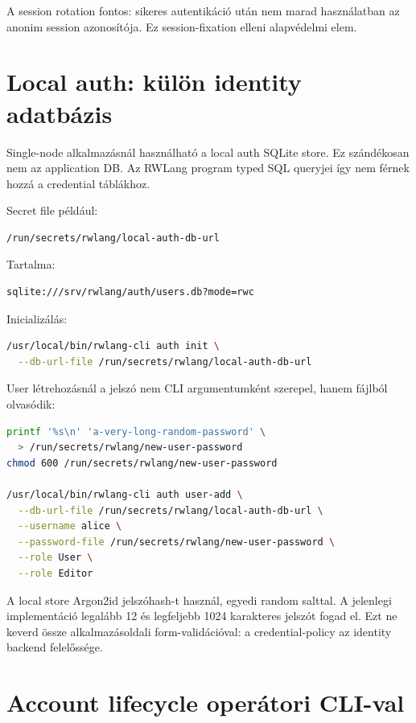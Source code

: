 A session rotation fontos: sikeres autentikáció után nem marad használatban az anonim session azonosítója. Ez session-fixation elleni alapvédelmi elem.

\section{Local auth: külön identity adatbázis}

Single-node alkalmazásnál használható a local auth SQLite store. Ez szándékosan nem az application DB. Az RWLang program typed SQL queryjei így nem férnek hozzá a credential táblákhoz.

Secret file például:

\begin{lstlisting}
/run/secrets/rwlang/local-auth-db-url
\end{lstlisting}

Tartalma:

\begin{lstlisting}
sqlite:///srv/rwlang/auth/users.db?mode=rwc
\end{lstlisting}

Inicializálás:

\begin{lstlisting}[language=bash]
/usr/local/bin/rwlang-cli auth init \
  --db-url-file /run/secrets/rwlang/local-auth-db-url
\end{lstlisting}

User létrehozásnál a jelszó nem CLI argumentumként szerepel, hanem fájlból olvasódik:

\begin{lstlisting}[language=bash]
printf '%s\n' 'a-very-long-random-password' \
  > /run/secrets/rwlang/new-user-password
chmod 600 /run/secrets/rwlang/new-user-password

/usr/local/bin/rwlang-cli auth user-add \
  --db-url-file /run/secrets/rwlang/local-auth-db-url \
  --username alice \
  --password-file /run/secrets/rwlang/new-user-password \
  --role User \
  --role Editor
\end{lstlisting}

A local store Argon2id jelszóhash-t használ, egyedi random salttal. A jelenlegi implementáció legalább 12 és legfeljebb 1024 karakteres jelszót fogad el. Ezt ne keverd össze alkalmazásoldali form-validációval: a credential-policy az identity backend felelőssége.

\section{Account lifecycle operátori CLI-val}

